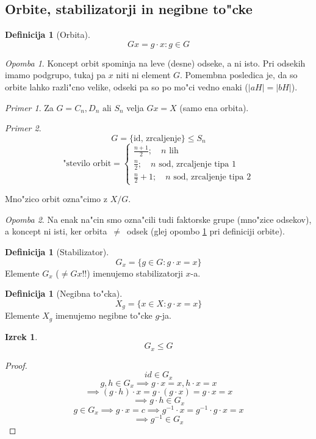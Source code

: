 \documentclass[a4paper,12pt]{article}
\theoremstyle{definition}
\newtheorem{defn}[counter]{Definicija}
\newtheorem{theorem}[counter]{Izrek}
\theoremstyle{remark}
\newtheorem*{ex}{Primer}
\newtheorem*{rem}{Opomba}
\begin{document}
\subsection{Orbite, stabilizatorji in negibne to"cke}
\begin{defn}[Orbita]
	$$Gx = {g \cdot x: g \in G}$$
\end{defn}
\begin{rem}
	\label{orbita_neq_odsek}
	Koncept orbit spominja na leve (desne) odseke, a ni isto. Pri odsekih imamo podgrupo, tukaj pa $x$ niti ni element $G$. Pomembna posledica je, da so orbite lahko razli"cno velike, odseki pa so po mo"ci vedno enaki ($|aH|=|bH|$).
\end{rem}
\begin{ex}
	Za $G=C_n, D_n \text{ ali } S_n$ velja $Gx = X$ (samo ena orbita).
\end{ex}
\begin{ex}
	$$G = \lbrace\text{id, zrcaljenje}\rbrace \leq S_n$$
	$$\text{"stevilo orbit} = \begin{cases}\frac{n+1}{2}; \quad n\text{ lih} \\ \frac{n}{2}; \quad n\text{ sod, zrcaljenje tipa }1 \\ \frac{n}{2}+1; \quad  n\text{ sod, zrcaljenje tipa }2\end{cases}$$
\end{ex}
Mno"zico orbit ozna"cimo z $X/G$.
\begin{rem}
	Na enak na"cin smo ozna"cili tudi faktorske grupe (mno"zice odsekov), a koncept ni isti, ker orbita~$\neq$~odsek (glej opombo \ref{orbita_neq_odsek} pri definiciji orbite).
\end{rem}
\begin{defn}[Stabilizator]
	$$G_x = \lbrace g \in G: g \cdot x = x \rbrace$$
	Elemente $G_x$ ($\neq Gx$!!) imenujemo stabilizatorji $x$-a.
\end{defn}
\begin{defn}[Negibna to"cka]
	$$X_g = \lbrace x \in X: g \cdot x = x \rbrace$$
	Elemente $X_g$ imenujemo negibne to"cke $g$-ja.
\end{defn}
\begin{theorem}
	$$G_x \leq G$$
\end{theorem}
\begin{proof}
	$$id \in G_x$$
	$$g, h \in G_x \implies g \cdot x = x, h \cdot x = x$$
	$$\implies (g \cdot h) \cdot x = g \cdot (g \cdot x) = g \cdot x = x $$
	$$\implies g \cdot h \in G_x$$
	$$g \in G_x \implies g \cdot x = c \implies g^{-1} \cdot x = g^{-1} \cdot g \cdot x = x$$
	$$ \implies g^{-1} \in G_x $$
\end{proof}
\end{document}
